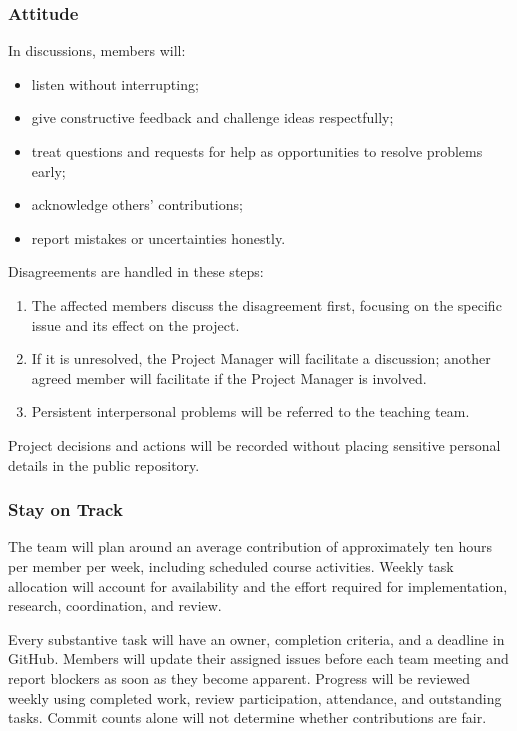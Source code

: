 \documentclass{article}
\begin{document}
\subsubsection*{Attitude}

In discussions, members will:

\begin{itemize}
    \item listen without interrupting;
    \item give constructive feedback and challenge ideas respectfully;
    \item treat questions and requests for help as opportunities to resolve
    problems early;
    \item acknowledge others' contributions;
    \item report mistakes or uncertainties honestly.
\end{itemize}

Disagreements are handled in these steps:

\begin{enumerate}
    \item The affected members discuss the disagreement first, focusing on
    the specific issue and its effect on the project.
    \item If it is unresolved, the Project Manager will facilitate a
    discussion; another agreed member will facilitate if the Project
    Manager is involved.
    \item Persistent interpersonal problems will be referred to the
    teaching team.
\end{enumerate}

Project decisions and actions will be recorded without placing sensitive
personal details in the public repository.

\subsubsection*{Stay on Track}

The team will plan around an average contribution of approximately
ten hours per member per week, including scheduled course activities.
Weekly task allocation will account for availability and the effort
required for implementation, research, coordination, and review.

Every substantive task will have an owner, completion criteria,
and a deadline in GitHub. Members will update their assigned issues
before each team meeting and report blockers as soon as they become
apparent. Progress will be reviewed weekly using completed work,
review participation, attendance, and outstanding tasks. Commit
counts alone will not determine whether contributions are fair.
\end{document}
